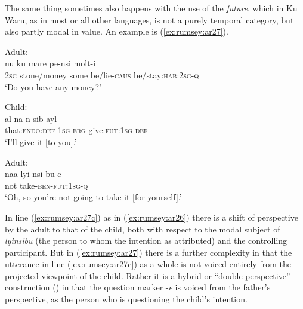 \documentclass[output=paper]{langsci/langscibook}
\begin{document}
The same thing sometimes also happens with the use of the \textit{future}, which in Ku Waru, as in most or all other languages, is not a purely temporal category, but also partly modal in value. An example is (\ref{ex:rumsey:ar27}).

\begin{exe}
	\ex \label{ex:rumsey:ar27}
	\begin{xlist}
	\ex Adult:\label{ex:rumsey:ar27a}\\
	\gll nu ku mare pe-nsi molt-i\\
	2\textsc{sg} stone/money some be/lie-\textsc{caus} be/stay:\textsc{hab}:2\textsc{sg}-\textsc{q}\\
	\trans ‘Do you have any money?’	
	
	\ex Child:\label{ex:rumsey:ar27b}\\
	\gll al na-n sib-ayl\\
	that:\textsc{endo}:\textsc{def}	1\textsc{sg}-\textsc{erg}			give:\textsc{fut}:1\textsc{sg}-\textsc{def}\\
	\trans ‘I’ll give it [to you].’
	
	\ex Adult:\label{ex:rumsey:ar27c}\\
	\gll naa	 lyi-nsi-bu-e\\
	not take-\textsc{ben}-\textsc{fut}:1\textsc{sg}-\textsc{q}\\
	\trans ‘Oh, so you’re not going to take it [for yourself].’
	\end{xlist}
\end{exe}

In line (\ref{ex:rumsey:ar27c}) as in (\ref{ex:rumsey:ar26}) there is a shift of perspective by the adult to that of the child, both with respect to the modal subject of \textit{lyinsibu} (the person to whom the intention as attributed) and the controlling participant. But in (\ref{ex:rumsey:ar27}) there is a further complexity in that the utterance in line (\ref{ex:rumsey:ar27c}) as a whole is not voiced entirely from the projected viewpoint of the child. Rather it is a hybrid or “double perspective” construction (\citealt{Evans2006a}) in that the question marker -\textit{e} is voiced from the father’s perspective, as the person who is questioning the child’s intention.
\end{document}
